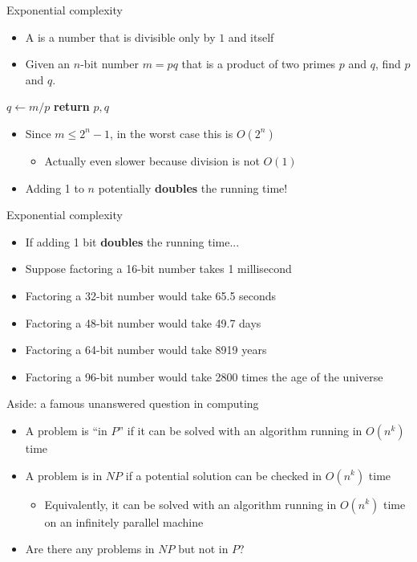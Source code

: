 \begin{frame}{Exponential complexity}
	\begin{itemize}
		\pause\item A  is a number that is divisible only by $1$ and itself
		\pause\item Given an $n$-bit number $m = pq$ that is a product of two primes $p$ and $q$, find $p$ and $q$.
	\end{itemize}
	\pause
	\begin{algorithmic}
			\State $q \gets m / p$
				\State \textbf{return} $p,q$
			\EndIf
		\EndFor
	\end{algorithmic}
	\begin{itemize}
		\pause\item Since $m \leq 2^n-1$, in the worst case this is $O(2^n)$
			\begin{itemize}
				\pause\item Actually even slower because division is not $O(1)$
			\end{itemize}
		\pause\item Adding 1 to $n$ potentially \textbf{doubles} the running time!
	\end{itemize}
\end{frame}

\begin{frame}{Exponential complexity}
	\begin{itemize}
		\pause\item If adding 1 bit \textbf{doubles} the running time...
		\pause\item Suppose factoring a 16-bit number takes 1 millisecond
		\pause\item Factoring a 32-bit number would take 65.5 seconds
		\pause\item Factoring a 48-bit number would take 49.7 days
		\pause\item Factoring a 64-bit number would take 8919 years
		\pause\item Factoring a 96-bit number would take 2800 times the age of the universe
	\end{itemize}
\end{frame}

\begin{frame}{Aside: a famous unanswered question in computing}
	\begin{itemize}
		\pause\item A problem is ``in $P$'' if it can be solved with an
			algorithm running in $O(n^k)$ time
		\pause\item A problem is in $NP$ if a potential solution can be checked in $O(n^k)$ time
			\begin{itemize}
				\pause\item Equivalently, it can be solved with an algorithm running in $O(n^k)$ time on an infinitely parallel machine
			\end{itemize}
		\pause\item Are there any problems in $NP$ but not in $P$?
	\end{itemize}
\end{frame}

